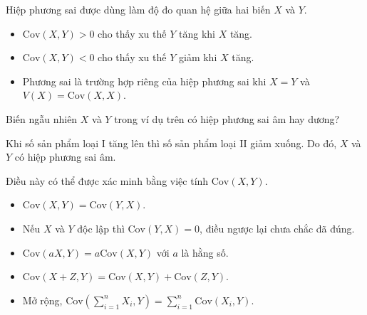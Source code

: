 \documentclass[12pt,a4paper]{article}
\begin{document}
\begin{dinhly}
Hiệp phương sai được dùng làm độ đo quan hệ giữa hai biến $X$ và $Y$.
\begin{itemize}
  \item $\mathrm{Cov}(X, Y) > 0$ cho thấy xu thế $Y$ tăng khi $X$ tăng.
  \item $\mathrm{Cov}(X, Y) < 0$ cho thấy xu thế $Y$ giảm khi $X$ tăng.
  \item Phương sai là trường hợp riêng của hiệp phương sai khi $X = Y$ và $V(X) = \mathrm{Cov}(X, X)$.
\end{itemize}
\end{dinhly}

\begin{vidu}
Biến ngẫu nhiên $X$ và $Y$ trong ví dụ trên có hiệp phương sai âm hay dương?

Khi số sản phẩm loại I tăng lên thì số sản phẩm loại II giảm xuống. Do đó, $X$ và $Y$ có hiệp phương sai âm.

Điều này có thể được xác minh bằng việc tính $\mathrm{Cov}(X, Y)$.
\end{vidu}

\begin{tinhchat}
\begin{itemize}
\item $\mathrm{Cov}(X, Y) = \mathrm{Cov}(Y, X)$.
\item Nếu $X$ và $Y$ độc lập thì $\mathrm{Cov}(Y, X) = 0$, điều ngược lại chưa chắc đã đúng.
\item $\mathrm{Cov}(aX, Y) = a\mathrm{Cov}(X, Y)$ với $a$ là hằng số.
\item $\mathrm{Cov}(X + Z, Y) = \mathrm{Cov}(X, Y) + \mathrm{Cov}(Z, Y)$.
\item Mở rộng, $\mathrm{Cov}\left(\displaystyle\sum_{i=1}^n X_i, Y\right) = \displaystyle\sum_{i=1}^n \mathrm{Cov}(X_i, Y)$.
\end{itemize}
\end{tinhchat}
\end{document}
